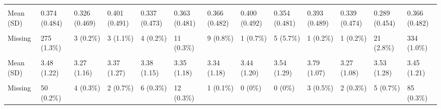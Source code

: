 \documentclass[
  single column]{article}
\begin{document}
\begin{landscape}
\begin{longtable}[t]{lllllllllllll}
\addlinespace
\cellcolor{gray!10}{male\_binary} & \cellcolor{gray!10}{} & \cellcolor{gray!10}{} & \cellcolor{gray!10}{} & \cellcolor{gray!10}{} & \cellcolor{gray!10}{} & \cellcolor{gray!10}{} & \cellcolor{gray!10}{} & \cellcolor{gray!10}{} & \cellcolor{gray!10}{} & \cellcolor{gray!10}{} & \cellcolor{gray!10}{} & \cellcolor{gray!10}{}\\
Mean (SD) & 0.374 (0.484) & 0.326 (0.469) & 0.401 (0.491) & 0.337 (0.473) & 0.363 (0.481) & 0.366 (0.482) & 0.400 (0.492) & 0.354 (0.481) & 0.393 (0.489) & 0.339 (0.474) & 0.289 (0.454) & 0.366 (0.482)\\
\cellcolor{gray!10}{Median [Min, Max]} & \cellcolor{gray!10}{0 [0, 1.00]} & \cellcolor{gray!10}{0 [0, 1.00]} & \cellcolor{gray!10}{0 [0, 1.00]} & \cellcolor{gray!10}{0 [0, 1.00]} & \cellcolor{gray!10}{0 [0, 1.00]} & \cellcolor{gray!10}{0 [0, 1.00]} & \cellcolor{gray!10}{0 [0, 1.00]} & \cellcolor{gray!10}{0 [0, 1.00]} & \cellcolor{gray!10}{0 [0, 1.00]} & \cellcolor{gray!10}{0 [0, 1.00]} & \cellcolor{gray!10}{0 [0, 1.00]} & \cellcolor{gray!10}{0 [0, \vphantom{2} 1.00]}\\
Missing & 275 (1.3\%) & 3 (0.2\%) & 3 (1.1\%) & 4 (0.2\%) & 11 (0.3\%) & 9 (0.8\%) & 1 (0.7\%) & 5 (5.7\%) & 1 (0.2\%) & 1 (0.2\%) & 21 (2.8\%) & 334 (1.0\%)\\
\cellcolor{gray!10}{neuroticism} & \cellcolor{gray!10}{} & \cellcolor{gray!10}{} & \cellcolor{gray!10}{} & \cellcolor{gray!10}{} & \cellcolor{gray!10}{} & \cellcolor{gray!10}{} & \cellcolor{gray!10}{} & \cellcolor{gray!10}{} & \cellcolor{gray!10}{} & \cellcolor{gray!10}{} & \cellcolor{gray!10}{} & \cellcolor{gray!10}{}\\
\addlinespace
Mean (SD) & 3.48 (1.22) & 3.27 (1.16) & 3.37 (1.27) & 3.38 (1.15) & 3.35 (1.18) & 3.34 (1.18) & 3.44 (1.20) & 3.54 (1.29) & 3.79 (1.07) & 3.27 (1.08) & 3.53 (1.28) & 3.45 (1.21)\\
\cellcolor{gray!10}{Median [Min, Max]} & \cellcolor{gray!10}{3.50 [1.00, 7.00]} & \cellcolor{gray!10}{3.25 [1.00, 7.00]} & \cellcolor{gray!10}{3.25 [1.00, 7.00]} & \cellcolor{gray!10}{3.25 [1.00, 7.00]} & \cellcolor{gray!10}{3.25 [1.00, 7.00]} & \cellcolor{gray!10}{3.25 [1.00, 7.00]} & \cellcolor{gray!10}{3.29 [1.00, 7.00]} & \cellcolor{gray!10}{3.50 [1.00, 6.50]} & \cellcolor{gray!10}{3.75 [1.00, 7.00]} & \cellcolor{gray!10}{3.25 [1.00, 7.00]} & \cellcolor{gray!10}{3.50 [1.00, 7.00]} & \cellcolor{gray!10}{3.50 [1.00, 7.00]}\\
Missing & 50 (0.2\%) & 4 (0.3\%) & 2 (0.7\%) & 6 (0.3\%) & 12 (0.3\%) & 1 (0.1\%) & 0 (0\%) & 0 (0\%) & 3 (0.5\%) & 2 (0.3\%) & 5 (0.7\%) & 85 (0.3\%)\\

\end{longtable}
\end{landscape}
\end{document}
